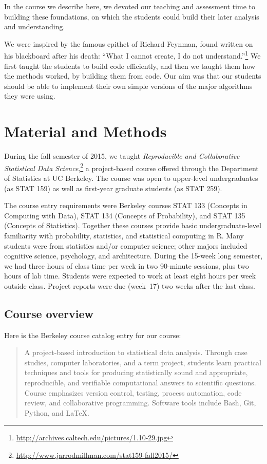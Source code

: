 In the course we describe here, we devoted our teaching and assessment time to
building these foundations, on which the students could build their later
analysis and understanding.

We were inspired by the famous epithet of Richard Feynman, found written on
his blackboard after his death: ``What I cannot create, I do not
understand.''\footnote{\url{http://archives.caltech.edu/pictures/1.10-29.jpg}}
We first taught the students to build code efficiently, and then we taught
them how the methods worked, by building them from code.  Our aim was that our
students should be able to implement their own simple versions of the major
algorithms they were using.

\section{Material and Methods}\label{methods}

During the fall semester of 2015, we taught \emph{Reproducible and Collaborative
Statistical Data Science},\footnote{\url{http://www.jarrodmillman.com/stat159-fall2015/}}
a project-based course offered through the Department of Statistics at UC Berkeley.
The course was open to upper-level undergraduates (as STAT 159) as well as
first-year graduate students (as STAT 259).

The course entry requirements were Berkeley courses STAT 133 (Concepts in
Computing with Data), STAT 134 (Concepts of Probability), and STAT 135
(Concepts of Statistics).  Together these courses provide basic
undergraduate-level familiarity with probability, statistics, and statistical
computing in R.
Many students were from statistics and/or computer science; other majors
included cognitive science, psychology, and architecture.
During the 15-week long semester, we had three hours of class time
per week in two 90-minute sessions, plus two hours of lab time.
Students were expected to work at least eight hours per week outside class.
Project reports were due (week~17) two weeks after the last class.

\subsection{Course overview}

Here is the Berkeley course catalog entry for our course:

\begin{quote}
A project-based introduction to statistical data analysis. Through case
studies, computer laboratories, and a term project, students learn
practical techniques and tools for producing statistically sound and
appropriate, reproducible, and verifiable computational answers to
scientific questions. Course emphasizes version control, testing,
process automation, code review, and collaborative programming.
Software tools include Bash, Git, Python, and \LaTeX.
\end{quote}

